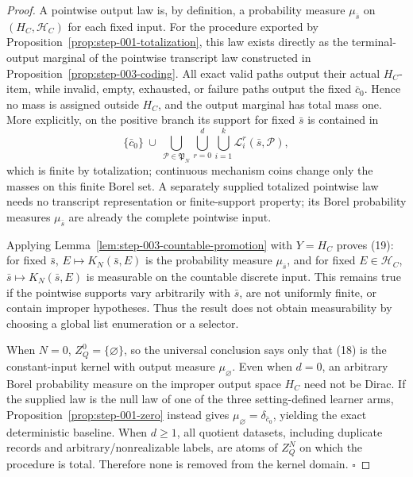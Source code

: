 \begin{proof}
A pointwise output law is, by definition, a probability measure
\(\mu_{\bar s}\) on \((H_C,\mathcal H_C)\) for each fixed input. For the
procedure exported by Proposition~\ref{prop:step-001-totalization}, this law exists directly as
the terminal-output marginal of the pointwise transcript law constructed in
Proposition~\ref{prop:step-003-coding}. All exact valid paths output
their actual \(H_C\)-item, while invalid, empty, exhausted, or failure paths
output the fixed \(\bar c_0\). Hence no mass is assigned outside \(H_C\),
and the output marginal has total mass one. More explicitly, on the
positive branch its support for fixed \(\bar s\) is contained in
\[
\{\bar c_0\}\ \cup\
\bigcup_{\mathcal P\in\mathfrak P_N}
\bigcup_{r=0}^{d}\bigcup_{i=1}^{k}
\mathcal L_i^r(\bar s,\mathcal P),
\tag{18a}
\]
which is finite by  totalization; continuous mechanism coins change
only the masses on this finite Borel set. A separately supplied totalized
pointwise law needs no transcript representation or finite-support
property; its Borel probability measures \(\mu_{\bar s}\) are already the
complete pointwise input.

Applying Lemma~\ref{lem:step-003-countable-promotion} with \(Y=H_C\) proves
(19): for fixed \(\bar s\), \(E\mapsto K_N(\bar s,E)\) is the probability
measure \(\mu_{\bar s}\), and for fixed \(E\in\mathcal H_C\),
\(\bar s\mapsto K_N(\bar s,E)\) is measurable on the countable discrete
input. This remains true if the pointwise supports vary arbitrarily with
\(\bar s\), are not uniformly finite, or contain improper hypotheses. Thus
the result does not obtain measurability by choosing a global list
enumeration or a selector.

When \(N=0\), \(Z_Q^0=\{\varnothing\}\), so the universal conclusion says
only that (18) is the constant-input kernel with output measure
\(\mu_{\varnothing}\). Even when \(d=0\), an arbitrary Borel probability
measure on the improper output space \(H_C\) need not be Dirac. If the
supplied law is the null law of one of the three setting-defined learner
arms, Proposition~\ref{prop:step-001-zero} instead gives
\(\mu_{\varnothing}=\delta_{\bar c_0}\), yielding the exact deterministic
baseline. When \(d\ge1\), all quotient
datasets, including duplicate records and arbitrary/nonrealizable labels,
are atoms of \(Z_Q^N\) on which the  procedure is total. Therefore
none is removed from the kernel domain. \(\square\)


\end{proof}

